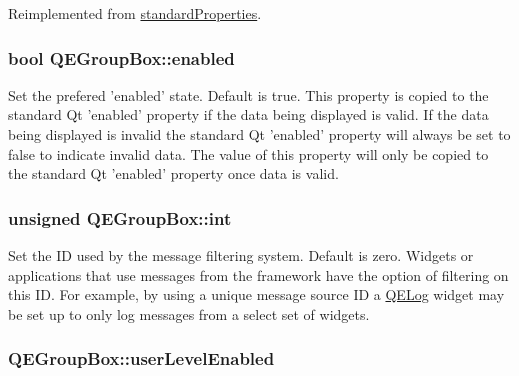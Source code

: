 Reimplemented from \hyperlink{classstandardProperties}{standardProperties}.

\hypertarget{classQEGroupBox_aa1baaa6c2cec673d24addade65acd2f3}{
\subsubsection[{enabled}]{\setlength{\rightskip}{0pt plus 5cm}bool QEGroupBox::enabled}}
\label{classQEGroupBox_aa1baaa6c2cec673d24addade65acd2f3}
Set the prefered 'enabled' state. Default is true. This property is copied to the standard Qt 'enabled' property if the data being displayed is valid. If the data being displayed is invalid the standard Qt 'enabled' property will always be set to false to indicate invalid data. The value of this property will only be copied to the standard Qt 'enabled' property once data is valid. \hypertarget{classQEGroupBox_a717ad8ca5b5dc1f44b118d31a2a5736d}{
\subsubsection[{int}]{\setlength{\rightskip}{0pt plus 5cm}unsigned QEGroupBox::int}}
\label{classQEGroupBox_a717ad8ca5b5dc1f44b118d31a2a5736d}
Set the ID used by the message filtering system. Default is zero. Widgets or applications that use messages from the framework have the option of filtering on this ID. For example, by using a unique message source ID a \hyperlink{classQELog}{QELog} widget may be set up to only log messages from a select set of widgets. \hypertarget{classQEGroupBox_ad26f2a98dccecbdfbe200e3f032262fb}{
\subsubsection[{userLevelEnabled}]{ QEGroupBox::userLevelEnabled}}
\label{classQEGroupBox_ad26f2a98dccecbdfbe200e3f032262fb}
